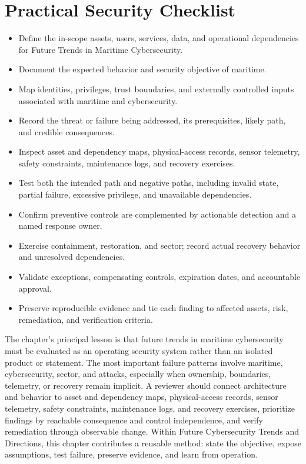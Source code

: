 \documentclass[11pt]{article}
\begin{document}
\section*{Practical Security Checklist}
\begin{itemize}[label=$\square$]
\item Define the in-scope assets, users, services, data, and operational dependencies for Future Trends in Maritime Cybersecurity.
\item Document the expected behavior and security objective of maritime.
\item Map identities, privileges, trust boundaries, and externally controlled inputs associated with maritime and cybersecurity.
\item Record the threat or failure being addressed, its prerequisites, likely path, and credible consequences.
\item Inspect asset and dependency maps, physical-access records, sensor telemetry, safety constraints, maintenance logs, and recovery exercises.
\item Test both the intended path and negative paths, including invalid state, partial failure, excessive privilege, and unavailable dependencies.
\item Confirm preventive controls are complemented by actionable detection and a named response owner.
\item Exercise containment, restoration, and sector; record actual recovery behavior and unresolved dependencies.
\item Validate exceptions, compensating controls, expiration dates, and accountable approval.
\item Preserve reproducible evidence and tie each finding to affected assets, risk, remediation, and verification criteria.
\end{itemize}
\begin{synthesisbox}
The chapter's principal lesson is that future trends in maritime cybersecurity must be evaluated as an operating security system rather than an isolated product or statement. The most important failure patterns involve maritime, cybersecurity, sector, and attacks, especially when ownership, boundaries, telemetry, or recovery remain implicit. A reviewer should connect architecture and behavior to asset and dependency maps, physical-access records, sensor telemetry, safety constraints, maintenance logs, and recovery exercises, prioritize findings by reachable consequence and control independence, and verify remediation through observable change. Within Future Cybersecurity Trends and Directions, this chapter contributes a reusable method: state the objective, expose assumptions, test failure, preserve evidence, and learn from operation.
\end{synthesisbox}
\end{document}
